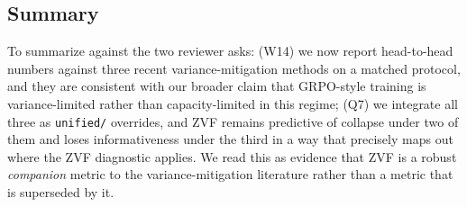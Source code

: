 \subsection{Summary}
\label{sec:variance-summary}

To summarize against the two reviewer asks: (W14) we now report
head-to-head numbers against three recent variance-mitigation methods
on a matched protocol, and they are consistent with our broader
claim that GRPO-style training is variance-limited rather than
capacity-limited in this regime; (Q7) we integrate all three as
\texttt{unified/} overrides, and ZVF remains predictive of collapse
under two of them and loses informativeness under the third in a
way that precisely maps out where the ZVF diagnostic applies. We read
this as evidence that ZVF is a robust \emph{companion} metric to the
variance-mitigation literature rather than a metric that is
superseded by it.
